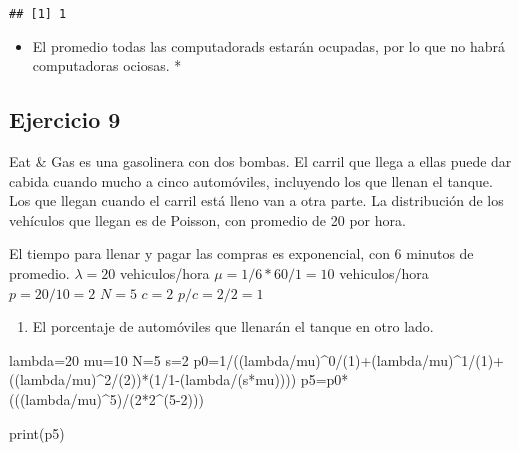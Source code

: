 \documentclass[
]{article}
\newenvironment{Shaded}{\begin{snugshade}}{\end{snugshade}}
\newcommand{\DecValTok}[1]{\textcolor[rgb]{0.00,0.00,0.81}{#1}}
\newcommand{\FunctionTok}[1]{\textcolor[rgb]{0.00,0.00,0.00}{#1}}
\newcommand{\NormalTok}[1]{#1}
\newcommand{\OtherTok}[1]{\textcolor[rgb]{0.56,0.35,0.01}{#1}}
\newcommand{\SpecialCharTok}[1]{\textcolor[rgb]{0.00,0.00,0.00}{#1}}
\providecommand{\tightlist}{%
  \setlength{\itemsep}{0pt}\setlength{\parskip}{0pt}}
\begin{document}
\begin{verbatim}
## [1] 1
\end{verbatim}

\begin{itemize}
\tightlist
\item
  El promedio todas las computadorads estarán ocupadas, por lo que no
  habrá computadoras ociosas. *
\end{itemize}

\hypertarget{ejercicio-9}{%
\subsection{Ejercicio 9}\label{ejercicio-9}}

Eat \& Gas es una gasolinera con dos bombas. El carril que llega a ellas
puede dar cabida cuando mucho a cinco automóviles, incluyendo los que
llenan el tanque. Los que llegan cuando el carril está lleno van a otra
parte. La distribución de los vehículos que llegan es de Poisson, con
promedio de 20 por hora.

El tiempo para llenar y pagar las compras es exponencial, con 6 minutos
de promedio. \(\lambda=20\) vehiculos/hora \(\mu=1/6 * 60/1=10\)
vehiculos/hora \(p=20/10=2\) \(N=5\) \(c=2\) \(p/c=2/2=1\)

\begin{enumerate}
\def\labelenumi{\alph{enumi})}
\tightlist
\item
  El porcentaje de automóviles que llenarán el tanque en otro lado.
\end{enumerate}

\begin{Shaded}
\begin{Highlighting}[]
\NormalTok{lambda}\OtherTok{=}\DecValTok{20}
\NormalTok{mu}\OtherTok{=}\DecValTok{10}
\NormalTok{N}\OtherTok{=}\DecValTok{5}
\NormalTok{s}\OtherTok{=}\DecValTok{2}
\NormalTok{p0}\OtherTok{=}\DecValTok{1}\SpecialCharTok{/}\NormalTok{((lambda}\SpecialCharTok{/}\NormalTok{mu)}\SpecialCharTok{\^{}}\DecValTok{0}\SpecialCharTok{/}\NormalTok{(}\DecValTok{1}\NormalTok{)}\SpecialCharTok{+}\NormalTok{(lambda}\SpecialCharTok{/}\NormalTok{mu)}\SpecialCharTok{\^{}}\DecValTok{1}\SpecialCharTok{/}\NormalTok{(}\DecValTok{1}\NormalTok{)}\SpecialCharTok{+}\NormalTok{((lambda}\SpecialCharTok{/}\NormalTok{mu)}\SpecialCharTok{\^{}}\DecValTok{2}\SpecialCharTok{/}\NormalTok{(}\DecValTok{2}\NormalTok{))}\SpecialCharTok{*}\NormalTok{(}\DecValTok{1}\SpecialCharTok{/}\DecValTok{1}\SpecialCharTok{{-}}\NormalTok{(lambda}\SpecialCharTok{/}\NormalTok{(s}\SpecialCharTok{*}\NormalTok{mu))))}
\NormalTok{p5}\OtherTok{=}\NormalTok{p0}\SpecialCharTok{*}\NormalTok{(((lambda}\SpecialCharTok{/}\NormalTok{mu)}\SpecialCharTok{\^{}}\DecValTok{5}\NormalTok{)}\SpecialCharTok{/}\NormalTok{(}\DecValTok{2}\SpecialCharTok{*}\DecValTok{2}\SpecialCharTok{\^{}}\NormalTok{(}\DecValTok{5{-}2}\NormalTok{)))}

\FunctionTok{print}\NormalTok{(p5)}
\end{Highlighting}
\end{Shaded}
\end{document}
